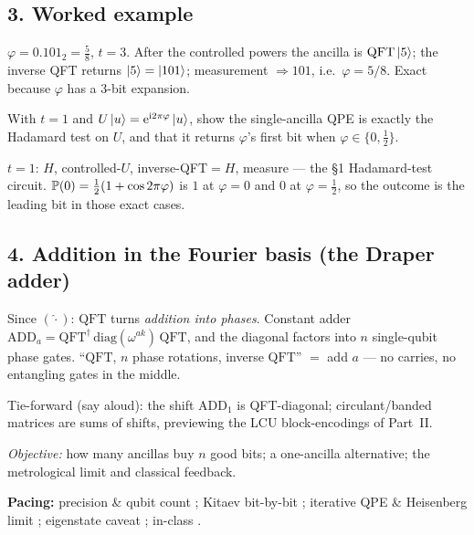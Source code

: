 \documentclass[11pt]{article}
\providecommand{\QFT}{\mathrm{QFT}}
\begin{document}
\subsection*{3. Worked example }
\begin{board}
$\varphi=0.101_2=\tfrac58$, $t=3$. After the controlled powers the ancilla is
$\QFT\ket5$; the inverse QFT returns $\ket5=\ket{101}$; measurement $\Rightarrow 101$,
i.e.\ $\varphi=5/8$. Exact because $\varphi$ has a 3-bit expansion.
\end{board}

\begin{inclass}\label{ic:l4-qpe}
With $t=1$ and $U\ket u=\mathrm{e}^{\mathrm{i}2\pi\varphi}\ket u$, show the single-ancilla QPE is exactly
the Hadamard test on $U$, and that it returns $\varphi$'s first bit when $\varphi\in\{0,\tfrac12\}$.
\end{inclass}
\begin{answer}
$t=1$: $H$, controlled-$U$, inverse-QFT$=H$, measure --- the \S1 Hadamard-test circuit.
$\mathbb{P}(0)=\tfrac12(1+\cos2\pi\varphi)$ is $1$ at $\varphi=0$ and $0$ at $\varphi=\tfrac12$,
so the outcome is the leading bit in those exact cases.
\end{answer}

\subsection*{4. Addition in the Fourier basis (the Draper adder) }
\begin{board}
Since $(\hat\cdot)$: $\QFT$ turns \emph{addition into phases}. Constant adder
$\mathrm{ADD}_a=\QFT^\dagger\,\mathrm{diag}(\omega^{ak})\,\QFT$, and the diagonal factors
into $n$ single-qubit phase gates. ``$\QFT$, $n$ phase rotations, inverse $\QFT$'' $=$ add
$a$ --- no carries, no entangling gates in the middle.
\end{board}
Tie-forward (say aloud): the shift $\mathrm{ADD}_1$ is QFT-diagonal; circulant/banded
matrices are sums of shifts, previewing the LCU block-encodings of Part~II.

\noindent\emph{Objective:} how many ancillas buy $n$ good bits; a one-ancilla
alternative; the metrological limit and classical feedback.

\medskip
\noindent\textbf{Pacing:} precision \& qubit count ; Kitaev bit-by-bit ;
iterative QPE \& Heisenberg limit ; eigenstate caveat ; in-class .
\end{document}
